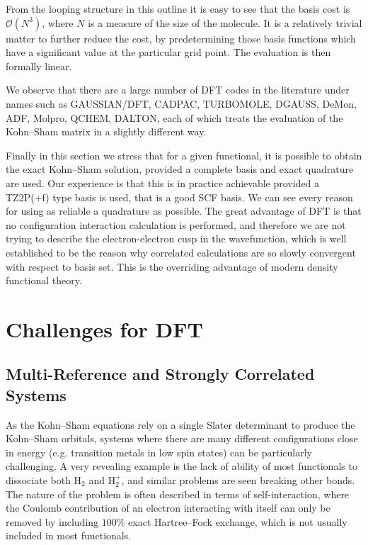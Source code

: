 \documentclass{article}
\theoremstyle{plain}\theoremheaderfont{\normalfont\itshape}\theorembodyfont{\rmfamily}\theoremseparator{.}\newtheorem*{rem}{Remark}\newtheorem*{ex}{Example}\newtheorem*{proof}{Proof}\newtheorem*{altp}{Alternative proof}
\theoremstyle{plain}\theoremheaderfont{\normalfont\bfseries}\theorembodyfont{\rmfamily}\theoremseparator{.}\newtheorem{thm}{Theorem}[section]\newtheorem{lem}[thm]{Lemma}\newtheorem{prop}[thm]{Proposition}\newtheorem*{cor}{Corollary}\newtheorem{defn}[thm]{Definition}\newtheorem{clm}[thm]{Claim}\newtheorem{clminproof}{Claim}
\theoremstyle{break}\theoremheaderfont{\normalfont\itshape}\theorembodyfont{\rmfamily}\theoremseparator{.\medskip}\newtheorem*{proofskip}{Proof}\newtheorem*{exs}{Examples}\newtheorem*{rems}{Remarks}
\theoremstyle{break}\theoremheaderfont{\normalfont\bfseries}\theorembodyfont{\rmfamily}\theoremseparator{.\medskip}\newtheorem{lemskip}[thm]{Lemma}\newtheorem{defnskip}[thm]{Definition}\newtheorem{propskip}[thm]{Proposition}\newtheorem{thmskip}[thm]{Theorem}
\numberwithin{equation}{section}
\begin{document}
    From the looping structure in this outline it is easy to see that the basis cost is \(\mathcal{O}(N^3)\), where \(N\) is a measure of the size of the molecule. It is a relatively trivial matter to further reduce the cost, by predetermining those basis functions which have a significant value at the particular grid point. The evaluation is then formally linear.

    We observe that there are a large number of DFT codes in the literature under names such as GAUSSIAN/DFT, CADPAC, TURBOMOLE, DGAUSS, DeMon, ADF, Molpro, QCHEM, DALTON, each of which treats the evaluation of the Kohn--Sham matrix in a slightly different way.

    Finally in this section we stress that for a given functional, it is possible to obtain the exact Kohn--Sham solution, provided a complete basis and exact quadrature are used. Our experience is that this is in practice achievable provided a TZ2P(+f) type basis is used, that is a good SCF basis. We can see every reason for using as reliable a quadrature as possible. The great advantage of DFT is that no configuration interaction calculation is performed, and therefore we are not trying to describe the electron-electron cusp in the wavefunction, which is well established to be the reason why correlated calculations are so slowly convergent with respect to basis set. This is the overriding advantage of modern density functional theory.
    
    \newpage
    \section{Challenges for DFT}
    \subsection{Multi-Reference and Strongly Correlated Systems}
    As the Kohn--Sham equations rely on a single Slater determinant to produce the Kohn--Sham orbitals, systems where there are many different configurations close in energy (e.g. transition metals in low spin states) can be particularly challenging. A very revealing example is the lack of ability of most functionals to dissociate both H\(_2\) and H\(_2^+\), and similar problems are seen breaking other bonds. The nature of the problem is often described in terms of self-interaction, where the Coulomb contribution of an electron interacting with itself can only be removed by including \(100\%\) exact Hartree--Fock exchange, which is not usually included in most functionals.
    
\end{document}
